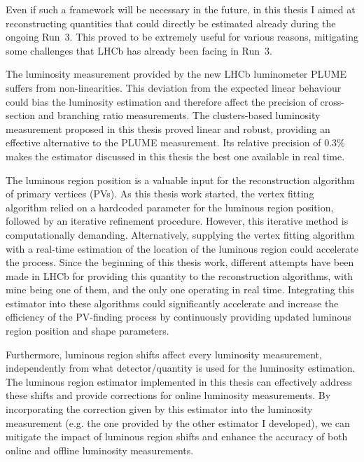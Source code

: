 Even if such a framework will be necessary in the future, in this thesis I aimed at reconstructing quantities that could directly be estimated already during the ongoing Run~3. This proved to be extremely useful for various reasons, mitigating some challenges that LHCb has already been facing in Run~3.

The luminosity measurement provided by the new LHCb luminometer PLUME suffers from non-linearities. This deviation from the expected linear behaviour could bias the luminosity estimation and therefore affect the precision of cross-section and branching ratio measurements. The clusters-based luminosity measurement proposed in this thesis proved linear and robust, providing an effective alternative to the PLUME measurement. Its relative precision of $0.3\%$ makes the estimator discussed in this thesis the best one available in real time.

The luminous region position is a valuable input for the reconstruction algorithm of primary vertices (PVs). As this thesis work started, the vertex fitting algorithm relied on a hardcoded parameter for the luminous region position, followed by an iterative refinement procedure. However, this iterative method is computationally demanding. Alternatively, supplying the vertex fitting algorithm with a real-time estimation of the location of the luminous region could accelerate the process. Since the beginning of this thesis work, different attempts have been made in LHCb for providing this quantity to the reconstruction algorithms, with mine being one of them, and the only one operating in real time. Integrating this estimator into these algorithms could significantly accelerate and increase the efficiency of the PV-finding process by continuously providing updated luminous region position and shape parameters. 

Furthermore, luminous region shifts affect every luminosity measurement, independently from what detector/quantity is used for the luminosity estimation. The luminous region estimator implemented in this thesis can effectively address these shifts and provide corrections for online luminosity measurements.
By incorporating the correction given by this estimator into the luminosity measurement  (e.g. the one provided by the other estimator I developed), we can mitigate the impact of luminous region shifts and enhance the accuracy of both online and offline luminosity measurements.

